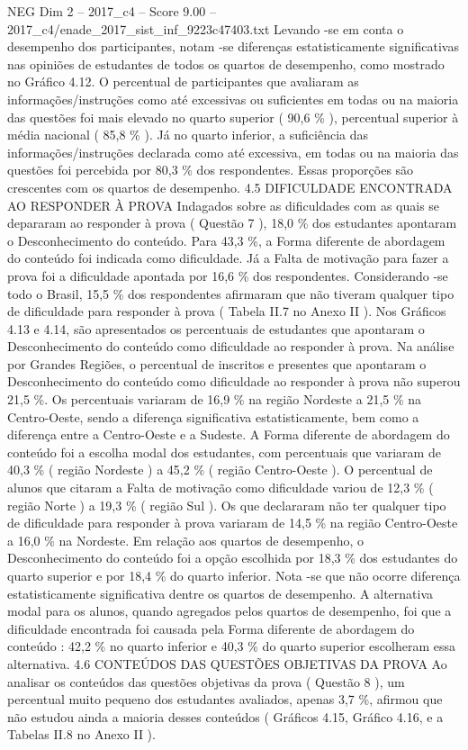 \begin{textsample}{NEG Dim 2 – 2017\_c4 – Score 9.00 – 2017\_c4/enade\_2017\_sist\_inf\_9223c47403.txt}
Levando -se em conta o desempenho dos participantes, notam -se diferenças estatisticamente significativas nas opiniões de estudantes de todos os quartos de desempenho, como mostrado no Gráfico 4.12.
O percentual de participantes que avaliaram as informações/instruções como até excessivas ou suficientes em todas ou na maioria das questões foi mais elevado no quarto superior ( 90,6 \% ), percentual superior à média nacional ( 85,8 \% ).
Já no quarto inferior, a suficiência das informações/instruções declarada como até excessiva, em todas ou na maioria das questões foi percebida por 80,3 \% dos respondentes.
Essas proporções são crescentes com os quartos de desempenho. 4.5 DIFICULDADE ENCONTRADA AO RESPONDER À PROVA Indagados sobre as dificuldades com as quais se depararam ao responder à prova ( Questão 7 ), 18,0 \% dos estudantes apontaram o Desconhecimento do conteúdo.
Para 43,3 \%, a Forma diferente de abordagem do conteúdo foi indicada como dificuldade.
Já a Falta de motivação para fazer a prova foi a dificuldade apontada por 16,6 \% dos respondentes.
Considerando -se todo o Brasil, 15,5 \% dos respondentes afirmaram que não tiveram qualquer tipo de dificuldade para responder à prova ( Tabela II.7 no Anexo II ).
Nos Gráficos 4.13 e 4.14, são apresentados os percentuais de estudantes que apontaram o Desconhecimento do conteúdo como dificuldade ao responder à prova.
Na análise por Grandes Regiões, o percentual de inscritos e presentes que apontaram o Desconhecimento do conteúdo como dificuldade ao responder à prova não superou 21,5 \%.
Os percentuais variaram de 16,9 \% na região Nordeste a 21,5 \% na Centro-Oeste, sendo a diferença significativa estatisticamente, bem como a diferença entre a Centro-Oeste e a Sudeste.
A Forma diferente de abordagem do conteúdo foi a escolha modal dos estudantes, com percentuais que variaram de 40,3 \% ( região Nordeste ) a 45,2 \% ( região Centro-Oeste ).
O percentual de alunos que citaram a Falta de motivação como dificuldade variou de 12,3 \% ( região Norte ) a 19,3 \% ( região Sul ).
Os que declararam não ter qualquer tipo de dificuldade para responder à prova variaram de 14,5 \% na região Centro-Oeste a 16,0 \% na Nordeste.
Em relação aos quartos de desempenho, o Desconhecimento do conteúdo foi a opção escolhida por 18,3 \% dos estudantes do quarto superior e por 18,4 \% do quarto inferior.
Nota -se que não ocorre diferença estatisticamente significativa dentre os quartos de desempenho.
A alternativa modal para os alunos, quando agregados pelos quartos de desempenho, foi que a dificuldade encontrada foi causada pela Forma diferente de abordagem do conteúdo : 42,2 \% no quarto inferior e 40,3 \% do quarto superior escolheram essa alternativa. 4.6 CONTEÚDOS DAS QUESTÕES OBJETIVAS DA PROVA Ao analisar os conteúdos das questões objetivas da prova ( Questão 8 ), um percentual muito pequeno dos estudantes avaliados, apenas 3,7 \%, afirmou que não estudou ainda a maioria desses conteúdos ( Gráficos 4.15, Gráfico 4.16, e a Tabelas II.8 no Anexo II ).

\end{textsample}
